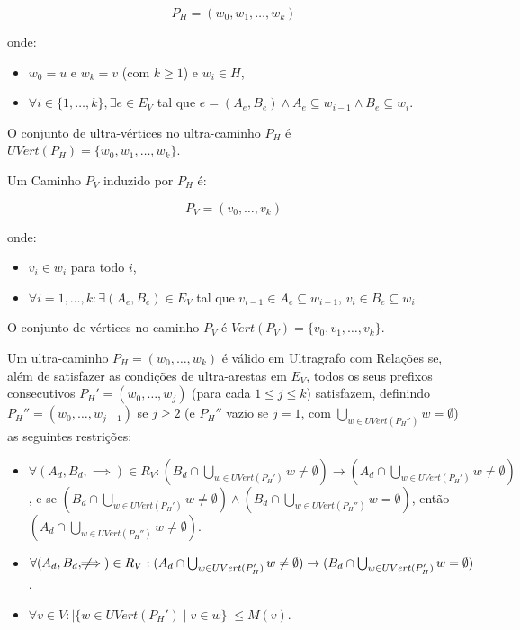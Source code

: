 \documentclass{article}
\begin{document}
\[ P_H = (w_0, w_1, \dots, w_k) \]

onde:

\begin{itemize}
    \item \( w_0 = u \) e \( w_k = v \) (com \( k \geq 1 \)) e \( w_i \in H \),
    \item \( \forall i \in \{1, \dots, k\}, \exists e \in E_V \) tal que \( e = (A_e, B_e) \wedge A_e \subseteq w_{i-1} \wedge B_e \subseteq w_i \).
\end{itemize}

O conjunto de ultra-vértices no ultra-caminho \( P_H \) é \( UVert(P_H) = \{ w_0, w_1, \dots, w_k \} \).

Um Caminho \( P_V \) induzido por \( P_H \) é:

\[ P_V = (v_0, \dots, v_k) \]

onde:

\begin{itemize}
    \item \( v_i \in w_i \) para todo \( i \),
    \item \( \forall i = 1, \dots, k: \exists (A_e, B_e) \in E_V \) tal que \( v_{i-1} \in A_e \subseteq w_{i-1} \), \( v_i \in B_e \subseteq w_i \).
\end{itemize}

O conjunto de vértices no caminho \( P_V \) é \( Vert(P_V) = \{ v_0, v_1, \dots, v_k \} \).
\newpage

Um ultra-caminho \( P_H = (w_0, \dots, w_k) \) é válido em Ultragrafo com Relações se, além de satisfazer as condições de ultra-arestas em \( E_V \), todos os seus prefixos consecutivos \( P_H' = (w_0, \dots, w_j) \) (para cada \( 1 \leq j \leq k \)) satisfazem, definindo \( P_H'' = (w_0, \dots, w_{j-1}) \) se \( j \geq 2 \) (e \( P_H'' \) vazio se \( j = 1 \), com \( \bigcup_{w \in UVert(P_H'')} w = \emptyset \))  as seguintes restrições:

\begin{itemize}
    \item \( \forall (A_d, B_d, \implies) \in R_V: (B_d \cap \bigcup_{w \in UVert(P_H')} w \neq \emptyset) \to (A_d \cap \bigcup_{w \in UVert(P_H')} w \neq \emptyset) \), e se \( (B_d \cap \bigcup_{w \in UVert(P_H')} w \neq \emptyset) \wedge (B_d \cap \bigcup_{w \in UVert(P_H'')} w = \emptyset) \), então \( (A_d \cap \bigcup_{w \in UVert(P_H'')} w \neq \emptyset) \).
    \item \( \forall (A_d, B_d, \not\!\!\!\implies) \in R_V: (A_d \cap \bigcup_{w \in UVert(P_H')} w \neq \emptyset) \to (B_d \cap \bigcup_{w \in UVert(P_H')} w = \emptyset) \).
    \item \( \forall v \in V: |\{ w \in UVert(P_H') \mid v \in w \}| \leq M(v) \).
\end{itemize}
\end{document}
